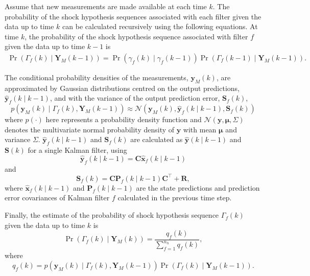 {Assume that new measurements are made available at each time $k$. The probability of the shock hypothesis sequences associated with each filter given the data up to time $k$ can be calculated recursively using the following equations. At time $k$, the probability of the shock hypothesis sequence associated with filter $f$ given the data up to time $k-1$ is
\begin{multline} \label{eq:Pr_Gammak_given_Ykm1}
	\Pr(\Gamma_f(k) \mid \mathbf{Y}_M(k-1)) = 
	\Pr(\gamma_f(k) \mid \gamma_f(k-1)) \Pr(\Gamma_f(k-1) \mid \mathbf{Y}_M(k-1)).
\end{multline}

The conditional probability densities of the measurements, $\mathbf{y}_M(k)$, are approximated by Gaussian distributions centred on the output predictions, $\mathbf{\hat{y}}_{f}(k \mid k-1)$,  and with the variance of the output prediction error, $\mathbf{S}_f(k)$,
\begin{equation} \label{eq:p_yk_given_Gammak_Ykm1}
	p(\mathbf{y}_M(k) \mid \Gamma_f(k), \mathbf{Y}_M(k-1)) \approx \mathcal{N}\left(\mathbf{y}_M(k), \mathbf{\hat{y}}_{f}(k \mid k-1),	\mathbf{S}_f(k) \right)
\end{equation}
%
where $p(\cdot)$ here represents a probability density function and $\mathcal{N}(\mathbf{y}, \mathbf{\mu}, \Sigma)$ denotes the multivariate normal probability density of $\mathbf{y}$ with mean $\mathbf{\mu}$ and variance $\Sigma$. $\mathbf{\hat{y}}_{f}(k \mid k-1)$ and $\mathbf{S}_f(k)$ are calculated as $\mathbf{\hat{y}}(k \mid k-1)$ and $\mathbf{S}(k)$ for a single Kalman filter, using 
\begin{equation} \label{eq:yfk_pred}
	\mathbf{\hat{y}}_{f}(k \mid k-1) = \mathbf{C}\mathbf{\hat{x}}_{f}(k \mid k-1)
\end{equation}
and
%
\begin{equation} \label{eq:Sfk}
	\mathbf{S}_f(k) = \mathbf{C}\mathbf{P}_f(k \mid k-1)\mathbf{C}^\intercal + \mathbf{R},
\end{equation}
where $\mathbf{\hat{x}}_{f}(k \mid k-1)$ and $\mathbf{P}_f(k \mid k-1)$ are the state predictions and prediction error covariances of Kalman filter $f$ calculated in the previous time step.

Finally, the estimate of the probability of shock hypothesis sequence $\Gamma_f(k)$ given the data up to time $k$ is
\begin{equation} \label{eq:Pr_Gammak_given_Yk}
	\Pr(\Gamma_f(k) \mid \mathbf{Y}_M(k)) = \frac{q_f(k)}{\sum_{f=1}^{n_h} q_f(k)},
\end{equation}
where
\begin{equation} \label{eq:qfk}
	q_f(k) = p(\mathbf{y}_M(k) \mid \Gamma_f(k), \mathbf{Y}_M(k-1)) \Pr(\Gamma_f(k) \mid \mathbf{Y}_M(k-1)).
\end{equation}

}
